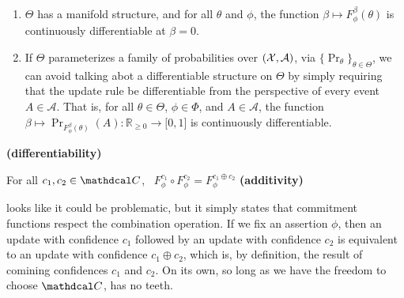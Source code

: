 \documentclass{article}
\def\cofunc{commitment function}
\def\confdom{\mathdcal C}
\begin{document}
\begin{CFaxioms}
    \item \label{ax:diffble}
    \begin{enumerate}
    \item $\Theta$ has a manifold structure, and
        for all $\theta$ and $\phi$, the function $\beta \mapsto F^{\beta}_\phi(\theta)$
        is continuously differentiable at $\beta = 0$. %
    \item 
    If $\Theta$ parameterizes a family of probabilities over $(\mathcal X, \mathcal A)$,
        via $\{ \Pr_\theta \}_{\theta \in \Theta}$, we can avoid talking abot a differentiable structure on $\Theta$ by simply requiring that the update rule be differentiable from the perspective of every event $A \in \mathcal A$.
        That is,
        for all $\theta \in \Theta$, $\phi \in \Phi$, and  $A \in \mathcal A$,
        the function $\beta \mapsto \Pr_{F^{\beta}_\phi(\theta)}(A)
        : \mathbb R_{\ge 0} \to \mathbb [0,1]$ is
        continuously differentiable.
            \label{ax:diffble2}
    \end{enumerate}
    \hfill \textbf{(differentiability)}
\end{CFaxioms}

\begin{CFaxioms}
    \item For all $c_1, c_2 \in \confdom$,~
        $F^{c_1}_\phi \circ F^{c_2}_\phi = F^{c_1 \oplus c_2}_\phi$
        \hfill \textbf{(additivity)} \label{ax:additivity}
\end{CFaxioms}
 looks like it could be problematic, but it simply states that \cofunc s respect the combination operation. 
If we fix an assertion $\phi$, then an update with confidence $c_1$ followed by an update with confidence $c_2$ is equivalent to an update with confidence $c_1 \oplus c_2$, which is, by definition, the result of comining confidences $c_1$ and $c_2$.
On its own, so long as we have the freedom to choose $\confdom$,  has no teeth.

\end{document}
